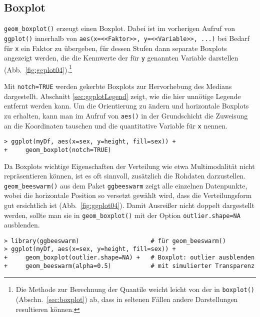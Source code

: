 \subsection{Boxplot}
\label{sec:ggplotBoxplot}

\lstinline!geom_boxplot()! erzeugt einen Boxplot. Dabei  ist im vorherigen Aufruf von \lstinline!ggplot()! innerhalb von \lstinline!aes(x=<<Faktor>>, y=<<Variable>>, ...)! bei Bedarf für \lstinline!x! ein Faktor zu übergeben, für dessen Stufen dann separate Boxplots angezeigt werden, die die Kennwerte der für \lstinline!y! genannten Variable darstellen (Abb.\ \ref{fig:ggplot04}).\footnote{Die Methode zur Berechnung der Quantile weicht leicht von der in \lstinline!boxplot()! (Abschn.\ \ref{sec:boxplot}) ab, dass in seltenen Fällen andere Darstellungen resultieren können.}

Mit \lstinline!notch=TRUE! werden gekerbte Boxplots zur Hervorhebung des Medians dargestellt. Abschnitt \ref{sec:ggplotLegend} zeigt, wie die hier unnötige Legende entfernt werden kann. Um die Orientierung zu ändern und horizontale Boxplots zu erhalten, kann man im Aufruf von \lstinline!aes()! in der Grundschicht die Zuweisung an die Koordinaten tauschen und die quantitative Variable für \lstinline!x! nennen.
\begin{lstlisting}
> ggplot(myDf, aes(x=sex, y=height, fill=sex)) +
+     geom_boxplot(notch=TRUE)
\end{lstlisting}

Da Boxplots wichtige Eigenschaften der Verteilung wie etwa Multimodalität nicht repräsentieren können, ist es oft sinnvoll, zusätzlich die Rohdaten darzustellen. \lstinline!geom_beeswarm()! aus dem Paket \lstinline!ggbeeswarm! \cite{Clarke2017} zeigt alle einzelnen Datenpunkte, wobei die horizontale Position so versetzt gewählt wird, dass die Verteilungsform gut ersichtlich ist (Abb.\ \ref{fig:ggplot04}). Damit Ausreißer nicht doppelt dargestellt werden, sollte man sie in \lstinline!geom_boxplot()! mit der Option \lstinline!outlier.shape=NA! ausblenden.
\begin{lstlisting}
> library(ggbeeswarm)                    # für geom_beeswarm()
> ggplot(myDf, aes(x=sex, y=height, fill=sex)) +
+     geom_boxplot(outlier.shape=NA) +   # Boxplot: outlier ausblenden
+     geom_beeswarm(alpha=0.5)           # mit simulierter Transparenz
\end{lstlisting}

